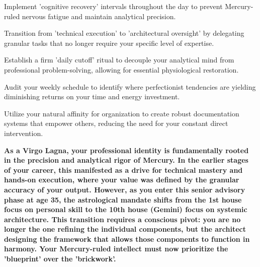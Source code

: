 \begin{diamondlist}
  \item {\fontsize{8.5}{12}\selectfont Implement 'cognitive recovery' intervals throughout the day to prevent Mercury-ruled nervous fatigue and maintain analytical precision.}
  \item {\fontsize{8.5}{12}\selectfont Transition from 'technical execution' to 'architectural oversight' by delegating granular tasks that no longer require your specific level of expertise.}
  \item {\fontsize{8.5}{12}\selectfont Establish a firm 'daily cutoff' ritual to decouple your analytical mind from professional problem-solving, allowing for essential physiological restoration.}
  \item {\fontsize{8.5}{12}\selectfont Audit your weekly schedule to identify where perfectionist tendencies are yielding diminishing returns on your time and energy investment.}
  \item {\fontsize{8.5}{12}\selectfont Utilize your natural affinity for organization to create robust documentation systems that empower others, reducing the need for your constant direct intervention.}
\end{diamondlist}


\label{topic40}

{\fontsize{9.5}{13.8}\selectfont\bfseries\color{DeepSlate} As a Virgo Lagna, your professional identity is fundamentally rooted in the precision and analytical rigor of Mercury. In the earlier stages of your career, this manifested as a drive for technical mastery and hands-on execution, where your value was defined by the granular accuracy of your output. However, as you enter this senior advisory phase at age 35, the astrological mandate shifts from the 1st house focus on personal skill to the 10th house (Gemini) focus on systemic architecture. This transition requires a conscious pivot: you are no longer the one refining the individual components, but the architect designing the framework that allows those components to function in harmony. Your Mercury-ruled intellect must now prioritize the 'blueprint' over the 'brickwork'.}\par\vspace{2mm}

